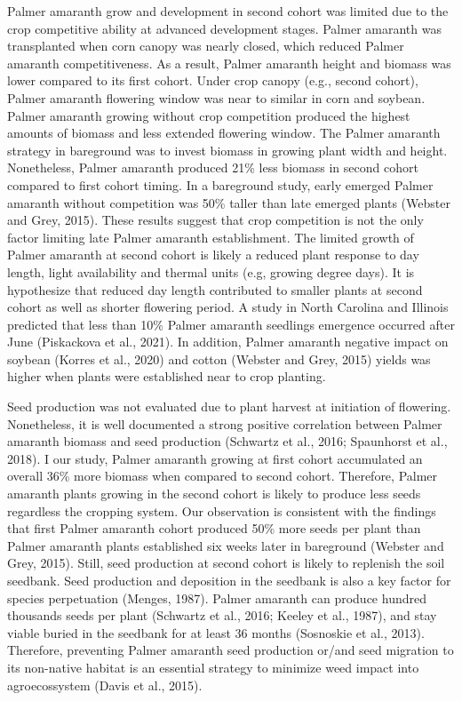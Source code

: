 \documentclass[utf8]{frontiersSCNS}
\begin{document}
Palmer amaranth grow and development in second cohort was limited due to
the crop competitive ability at advanced development stages. Palmer
amaranth was transplanted when corn canopy was nearly closed, which
reduced Palmer amaranth competitiveness. As a result, Palmer amaranth
height and biomass was lower compared to its first cohort. Under crop
canopy (e.g., second cohort), Palmer amaranth flowering window was near
to similar in corn and soybean. Palmer amaranth growing without crop
competition produced the highest amounts of biomass and less extended
flowering window. The Palmer amaranth strategy in bareground was to
invest biomass in growing plant width and height. Nonetheless, Palmer
amaranth produced 21\% less biomass in second cohort compared to first
cohort timing. In a bareground study, early emerged Palmer amaranth
without competition was 50\% taller than late emerged plants (Webster
and Grey, 2015). These results suggest that crop competition is not the
only factor limiting late Palmer amaranth establishment. The limited
growth of Palmer amaranth at second cohort is likely a reduced plant
response to day length, light availability and thermal units (e.g,
growing degree days). It is hypothesize that reduced day length
contributed to smaller plants at second cohort as well as shorter
flowering period. A study in North Carolina and Illinois predicted that
less than 10\% Palmer amaranth seedlings emergence occurred after June
(Piskackova et al., 2021). In addition, Palmer amaranth negative impact
on soybean (Korres et al., 2020) and cotton (Webster and Grey, 2015)
yields was higher when plants were established near to crop planting.

Seed production was not evaluated due to plant harvest at initiation of
flowering. Nonetheless, it is well documented a strong positive
correlation between Palmer amaranth biomass and seed production
(Schwartz et al., 2016; Spaunhorst et al., 2018). I our study, Palmer
amaranth growing at first cohort accumulated an overall 36\% more
biomass when compared to second cohort. Therefore, Palmer amaranth
plants growing in the second cohort is likely to produce less seeds
regardless the cropping system. Our observation is consistent with the
findings that first Palmer amaranth cohort produced 50\% more seeds per
plant than Palmer amaranth plants established six weeks later in
bareground (Webster and Grey, 2015). Still, seed production at second
cohort is likely to replenish the soil seedbank. Seed production and
deposition in the seedbank is also a key factor for species perpetuation
(Menges, 1987). Palmer amaranth can produce hundred thousands seeds per
plant (Schwartz et al., 2016; Keeley et al., 1987), and stay viable
buried in the seedbank for at least 36 months (Sosnoskie et al., 2013).
Therefore, preventing Palmer amaranth seed production or/and seed
migration to its non-native habitat is an essential strategy to minimize
weed impact into agroecossystem (Davis et al., 2015).
\end{document}
